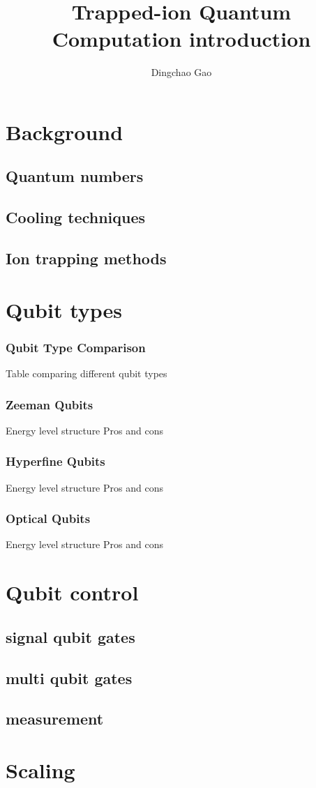 \documentclass[18 pt]{beamer}
\title{Trapped-ion Quantum Computation introduction}
\author[Gcc]{Dingchao Gao}
\institute[ISCAS]{Institute of Software Chinese Academy of Sciences}
\begin{document}
\begin{frame}[plain]
  \titlepage
\end{frame}
\section{Background}
\subsection{Quantum numbers}
\subsection{Cooling techniques}
\subsection{Ion trapping methods}

\section{Qubit types}
\begin{frame}{}
  \frametitle{Qubit Type Comparison}
  Table comparing different qubit types 
\end{frame}
\begin{frame}{}
  \frametitle{Zeeman Qubits}
  Energy level structure
  Pros and cons \end{frame}
  \begin{frame}{}
  \frametitle{Hyperfine Qubits}
  Energy level structure
  Pros and cons
\end{frame}
\begin{frame}{}
  \frametitle{Optical Qubits}
  Energy level structure
  Pros and cons
\end{frame}
\section{Qubit control}
\subsection{signal qubit gates}
\subsection{multi qubit gates}
\subsection{measurement}
\section{Scaling}
\end{document}
